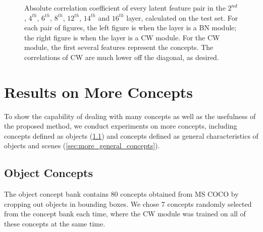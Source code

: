 \documentclass{article}
\begin{document}
\begin{figure}[htbp]
{\begin{minipage}[b]{0.45\linewidth}
{        }
    \end{minipage}}
    \caption{
    Absolute correlation coefficient of every latent feature pair in the $2^{nd}$, $4^{th}$, $6^{th}$, $8^{th}$, $12^{th}$, $14^{th}$ and $16^{th}$ layer, calculated on the test set. For each pair of figures, the left figure is when the layer is a BN module; the right figure is when the layer is a CW module. For the CW module, the first several features represent the concepts. The correlations of CW are much lower off the diagonal, as desired. \label{fig:correlation_all}
}
\end{figure}

\section{Results on More Concepts}
\label{sec:more_concepts}
To show the capability of dealing with many concepts as well as the usefulness of the proposed method, we conduct experiments on more concepts, including concepts defined as objects (\ref{sec:more_object_concepts}) and concepts defined as general characteristics of objects and scenes (\ref{sec:more_general_concepts}).

\subsection{Object Concepts}
\label{sec:more_object_concepts}
 The object concept bank contains 80 concepts obtained from MS COCO \cite{lin2014microsoft} by cropping out objects in bounding boxes. We chose 7 concepts randomly selected from the concept bank each time, where the CW module was trained on all of these concepts at the same time.
\end{document}
